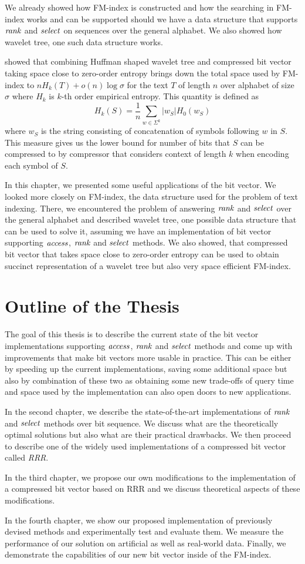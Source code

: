 We already showed how FM-index is constructed and how the searching in FM-index works and can be
supported should we have a data structure that supports $\mathit{rank}$ and $\mathit{select}$ on sequences over the general
alphabet. We also showed how wavelet tree, one such data structure works.

\cite{karkkainen2011fixed} showed that combining Huffman shaped wavelet tree and compressed bit vector taking
space close to zero-order entropy brings down the total space used by FM-index to $nH_k(T)+o(n)\log\sigma$ for
the text $T$ of length $n$ over alphabet of size $\sigma$ where $H_k$ is $k$-th order empirical entropy. This
quantity is defined as $$H_k(S) = \frac{1}{n} \sum_{w\in \Sigma^k} |w_S| H_0(w_S)$$ where $w_S$ is the string
consisting of concatenation of symbols following $w$ in $S$. This measure gives us the lower bound for number
of bits that $S$ can be compressed to by compressor that considers context of length $k$ when encoding each
symbol of $S$.

In this chapter, we presented some useful applications of the bit vector. We looked more closely on
FM-index, the data structure used for the problem of text indexing. There, we encountered the
problem of answering $\mathit{rank}$ and $\mathit{select}$ over the general alphabet and described wavelet tree,
one possible data structure that can be used to solve it, assuming we have an implementation of
bit vector supporting $\mathit{access}$, $\mathit{rank}$ and $\mathit{select}$ methods. We also showed, that compressed bit
vector that takes space close to zero-order entropy can be used to obtain succinct representation of
a wavelet tree but also very space efficient FM-index.

\section{Outline of the Thesis}

The goal of this thesis is to describe the current state of the bit vector implementations
supporting $\mathit{access}$, $\mathit{rank}$ and $\mathit{select}$ methods and come up with improvements that
make bit vectors more usable in practice. This can be either by speeding up the current
implementations, saving some additional space but also by combination of these two as
obtaining some new trade-offs of query time and space used by the implementation can
also open doors to new applications.

In the second chapter, we describe the state-of-the-art implementations of $\mathit{rank}$ and
$\mathit{select}$ methods over bit sequence. We discuss what are the theoretically optimal
solutions but also what are their practical drawbacks. We then proceed to describe one
of the widely used implementations of a compressed bit vector called \textit{RRR}.

In the third chapter, we propose our own modifications to the implementation of
a compressed bit vector based on RRR and we discuss theoretical aspects of these
modifications.

In the fourth chapter, we show our proposed implementation of previously devised
methods and experimentally test and evaluate them. We measure the performance
of our solution on artificial as well as real-world data. Finally, we demonstrate
the capabilities of our new bit vector inside of the FM-index.
